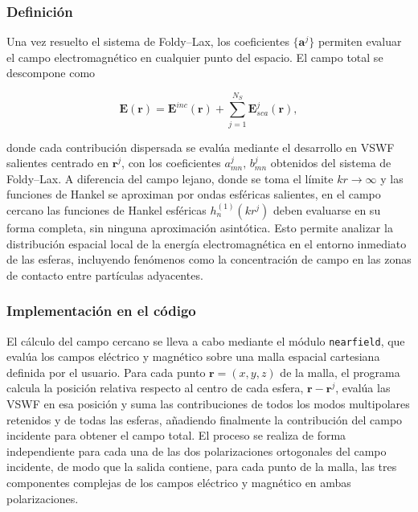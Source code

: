 \subsubsection{Definición}

Una vez resuelto el sistema de Foldy--Lax, los coeficientes
$\{\mathbf{a}^{j}\}$ permiten evaluar el campo electromagnético en
cualquier punto del espacio. El campo total se descompone como

\begin{equation}
  \mathbf{E}(\mathbf{r})
  = \mathbf{E}^{inc}(\mathbf{r})
  + \sum_{j=1}^{N_S} \mathbf{E}_{sca}^{j}(\mathbf{r}),
\end{equation}

donde cada contribución dispersada se evalúa mediante el desarrollo en
VSWF salientes centrado en
$\mathbf{r}^{j}$, con los coeficientes $a_{mn}^{j},\,b_{mn}^{j}$
obtenidos del sistema de Foldy--Lax. A diferencia del campo lejano,
donde se toma el límite $kr \to \infty$ y las funciones de Hankel se
aproximan por ondas esféricas salientes, en el campo cercano las
funciones de Hankel esféricas $h_n^{(1)}(kr^{j})$ deben evaluarse en su
forma completa, sin ninguna aproximación asintótica. Esto permite
analizar la distribución espacial local de la energía electromagnética
en el entorno inmediato de las esferas, incluyendo fenómenos como la
concentración de campo en las zonas de contacto entre partículas
adyacentes.

\subsubsection{Implementación en el código}

El cálculo del campo cercano se lleva a cabo mediante el módulo
\texttt{nearfield}, que evalúa los campos eléctrico y magnético sobre
una malla espacial cartesiana definida por el usuario. Para cada punto
$\mathbf{r} = (x,y,z)$ de la malla, el programa calcula la posición
relativa respecto al centro de cada esfera, $\mathbf{r}-\mathbf{r}^{j}$,
evalúa las VSWF en esa posición y suma las contribuciones de todos los
modos multipolares retenidos y de todas las esferas, añadiendo
finalmente la contribución del campo incidente para obtener el campo
total. El proceso se realiza de forma independiente para cada una de
las dos polarizaciones ortogonales del campo incidente, 
de modo que la salida contiene, para cada punto
de la malla, las tres componentes complejas de los campos eléctrico y
magnético en ambas polarizaciones.


